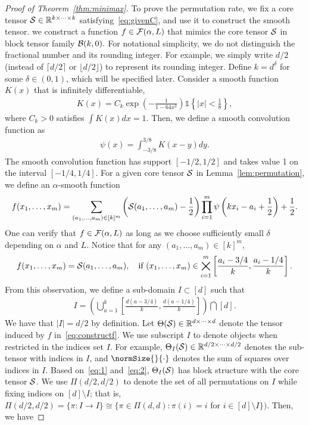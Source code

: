 \documentclass[12pt]{article}
\theoremstyle{definition}
\begin{document}
\begin{proof}[Proof of Theorem~\ref{thm:minimax}]
To prove the permutation rate, we fix a core tensor $\mathcal{S}\in\mathbb{R}^{k\times \cdots \times k}$ satisfying~\eqref{eq:givenC}, and use it to construct the smooth tensor. we construct a function $f\in\mathcal{F}(\alpha,L)$ that mimics the core tensor $\mathcal{S}$ in block tensor family $\mathcal{B}(k,0).$  For notational simplicity, we do not distinguish the fractional number and its rounding integer. For example, we simply write $d/2$ (instead of $\lceil d/2 \rceil$ or $\lfloor d/2 \rfloor$) to represent its rounding integer. Define $k = d^\delta$ for some $\delta\in(0,1)$, which will be specified later. Consider a smooth function $K(x)$ that is infinitely differentiable,
\begin{align}
    K(x) = C_k\exp\left(-\frac{1}{1-64x^2}\right)\mathds{1}\left\{|x|<\frac{1}{8}\right\},
\end{align}
where $C_k>0$ satisfies $\int K(x)dx = 1.$  Then, we define a smooth convolution function as
\begin{align}
    \psi(x) = \int_{-3/8}^{3/8}K(x-y)dy.
\end{align}
The smooth convolution function has support $[-1/2,1/2]$ and takes value 1 on the interval $[-1/4,1/4]$. 
For a given core tensor $\mathcal{S}$ in Lemma~\ref{lem:permutation}, we define an $\alpha$-smooth function
\begin{align}\label{eq:constructf}
    f(x_1,\ldots,x_m) = \sum_{(a_1,\ldots,a_m)\in[k]^m}\left(\mathcal{S}(a_1,\ldots,a_m)-\frac{1}{2}\right)\prod_{i=1}^m \psi\left(kx_i-a_i+\frac{1}{2}\right) + \frac{1}{2}.
\end{align}
One can verify that $f\in\mathcal{F}(\alpha,L)$ as long as we choose sufficiently small $\delta$ depending on $\alpha$ and $L$. Notice that for any $(a_1,\ldots,a_m)\in [k]^m$, 
\begin{align}\label{eq:1}
f(x_1,\ldots,x_m) = \mathcal{S}(a_1,\ldots,a_m), \quad \text{if } (x_1,\ldots,x_m)\in \bigtimes_{i=1}^m\left[\frac{a_i-3/4}{k},\frac{a_i-1/4}{k}\right].
\end{align}
From this observation, we define a sub-domain $I\subset [d]$ such that
\begin{align}\label{eq:2}
    I = \left(\bigcup_{a=1}^k\left[\frac{d(a-3/4)}{k},\frac{d(a-1/4)}{k}\right]\right)\bigcap [d].
\end{align}
We have that $|I|=d/2$ by definition. Let $\Theta(\mathcal{S})\in\mathbb{R}^{d\times \cdots \times d}$ denote the tensor induced by $f$ in~\eqref{eq:constructf}. We use subscript $I$ to denote objects when restricted in the indices set $I$. For example, $\Theta_I(\mathcal{S})\in\mathbb{R}^{d/2 \times \cdots \times d/2}$ denotes the sub-tensor with indices in $I$, and $\normSize{}{\cdot}$ denotes the sum of squares over indices in $I$. Based on~\eqref{eq:1} and~\eqref{eq:2}, $\Theta_I(\mathcal{S})$ has block structure with the core tensor $\mathcal{S}$. We use $\Pi(d/2,d/2)$ to denote the set of all permutations on $I$ while fixing indices on $[d]\setminus I$; that is, $\Pi(d/2,d/2)=\{\pi\colon I\to I\}\cong \{\pi\in\Pi(d,d)\colon \pi(i) = i \text{ for } i\in[d]\setminus I\})$. Then, we have

\end{proof}
\end{document}

